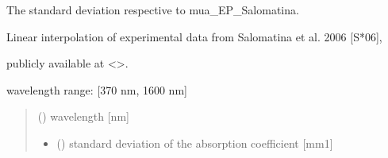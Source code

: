 \documentclass[letterpaper,10pt,english]{sphinxmanual}
\begin{document}
\begin{fulllineitems}
\label{\detokenize{03_absorption_coefficient:skinoptics.absorption_coefficient.std_mua_EP_Salomatina}}
\pysigstartsignatures
{}
\pysigstopsignatures
\begin{DUlineblock}{0em}
\item[] The standard deviation respective to mua\_EP\_Salomatina.
\item[] Linear interpolation of experimental data from Salomatina et al. 2006 {[}S*06{]},
\item[] publicly available at \textless{}\textgreater{}.
\end{DUlineblock}

\begin{DUlineblock}{0em}
\item[] wavelength range: {[}370 nm, 1600 nm{]}
\end{DUlineblock}
\begin{quote}\begin{description}
\sphinxAtStartPar
{} () \textendash{} wavelength {[}nm{]}

\sphinxAtStartPar
\begin{itemize}
\item {} 
\sphinxAtStartPar
{} () \textendash{} standard deviation of the absorption coefficient {[}mm\sphinxhyphen{}1{]}

\end{itemize}


\end{description}\end{quote}

\end{fulllineitems}

\end{document}
